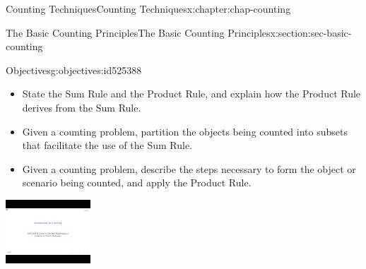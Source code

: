 \documentclass[oneside,10pt,]{book}
\numberwithin{equation}{section}
\newlength{\qrsize}
\newlength{\previewwidth}
\begin{document}
%
%
\typeout{************************************************}
\typeout{************************************************}
%
\begin{chapterptx}{Counting Techniques}{}{Counting Techniques}{}{}{x:chapter:chap-counting}
%
%
\typeout{************************************************}
\typeout{************************************************}
%
\begin{sectionptx}{The Basic Counting Principles}{}{The Basic Counting Principles}{}{}{x:section:sec-basic-counting}
\begin{objectives}{Objectives}{g:objectives:id525388}
%
\begin{itemize}[label=\textbullet]
\item{}State the Sum Rule and the Product Rule, and explain how the Product Rule derives from the Sum Rule.%
\item{}Given a counting problem, partition the objects being counted into subsets that facilitate the use of the Sum Rule.%
\item{}Given a counting problem, describe the steps necessary to form the object or scenario being counted, and apply the Product Rule.%
\end{itemize}
\end{objectives}
\begin{sidebyside}{1}{0}{0}{0}%
\begin{sbspanel}{1}%
\setlength{\qrsize}{9em}
\setlength{\previewwidth}{\linewidth}
\addtolength{\previewwidth}{-\qrsize}
\begin{tcbraster}[raster columns=2, raster column skip=1pt, raster halign=center, raster force size=false, raster left skip=0pt, raster right skip=0pt]%
\begin{tcolorbox}[previewstyle, width=\previewwidth]%
\includegraphics[width=0.80\linewidth,height=\qrsize,keepaspectratio]{images/video-intro-to-counting.jpg}%

\end{tcolorbox}
\end{tcbraster}
\end{sbspanel}
\end{sidebyside}
\end{sectionptx}
\end{chapterptx}
\end{document}
